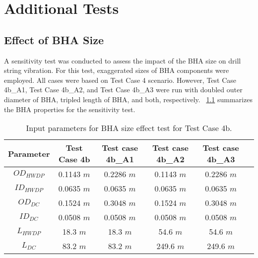 \chapter{Additional Tests}
\section{Effect of BHA Size}
A sensitivity test was conducted to assess the impact of the BHA size on drill string vibration. For this test, exaggerated sizes of BHA components were employed. All cases were based on Test Case 4 scenario. However, Test Case 4b\_A1, Test Case 4b\_A2, and Test Case 4b\_A3 were run with doubled outer diameter of BHA, tripled length of BHA, and both, respectively. \tablename~\ref{table_sensitivity_size_4b_input} summarizes the BHA properties for the sensitivity test.
\begin{table}
    \centering
    \begin{tabular}{|c|c|c|c|c|c|}
       \hline 
       \textbf{Parameter} & \textbf{Test Case 4b} & \textbf{Test case 4b\_A1} & \textbf{Test case 4b\_A2} & \textbf{Test case 4b\_A3}\\
       \hline
       $OD_{HWDP}$ & 0.1143 $m$ & 0.2286 $m$ & 0.1143 $m$ & 0.2286 $m$ \\
       \hline
       $ID_{HWDP}$ & 0.0635 $m$ & 0.0635 $m$ & 0.0635 $m$ & 0.0635 $m$ \\
       \hline
       $OD_{DC}$ & 0.1524 $m$ & 0.3048 $m$ & 0.1524 $m$ & 0.3048 $m$ \\
       \hline
       $ID_{DC}$ & 0.0508 $m$ & 0.0508 $m$ & 0.0508 $m$ & 0.0508 $m$ \\                                                    
       \hline
       $L_{HWDP}$ & 18.3 $m$ & 18.3 $m$ & 54.6 $m$ & 54.6 $m$ \\
       \hline
       $L_{DC}$ & 83.2 $m$ & 83.2 $m$ & 249.6 $m$ & 249.6 $m$ \\
       \hline
      \end{tabular}
    \caption[Input parameters for BHA size effect test for Test Case 4b]{Input parameters for BHA size effect test for Test Case 4b.}
    \label{table_sensitivity_size_4b_input}
\end{table} 

